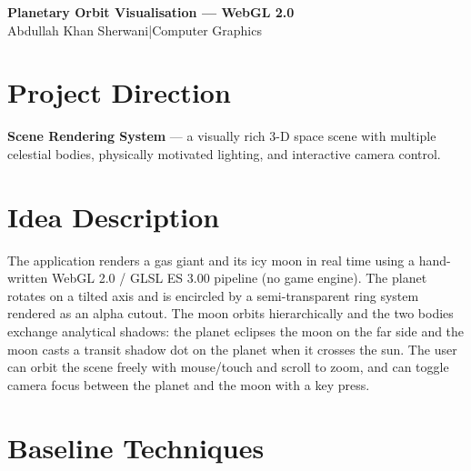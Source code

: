 \documentclass[11pt,a4paper]{article}
\begin{document}
\begin{center}
  {\Large\bfseries Planetary Orbit Visualisation --- WebGL 2.0}\\[4pt]
  Abdullah Khan Sherwani\quad|\quad Computer Graphics
\end{center}

\section{Project Direction}

\textbf{Scene Rendering System} --- a visually rich 3-D space scene with
multiple celestial bodies, physically motivated lighting, and interactive camera
control.

\section{Idea Description}

The application renders a gas giant and its icy moon in real time using a
hand-written WebGL 2.0 / GLSL ES 3.00 pipeline (no game engine).
The planet rotates on a tilted axis and is encircled by a semi-transparent ring
system rendered as an alpha cutout.
The moon orbits hierarchically and the two bodies exchange analytical shadows:
the planet eclipses the moon on the far side and the moon casts a transit shadow
dot on the planet when it crosses the sun.
The user can orbit the scene freely with mouse/touch and scroll to zoom, and can
toggle camera focus between the planet and the moon with a key press.

\section{Baseline Techniques}
\end{document}

